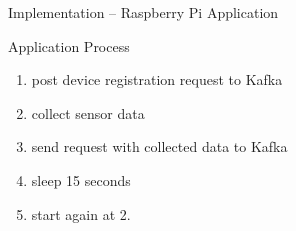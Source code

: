 \begin{frame}{Implementation -- Raspberry Pi Application}
  \begin{block}{Application Process}
    \begin{enumerate}
      \item post device registration request to Kafka
      \item collect sensor data
      \item send request with collected data to Kafka
      \item sleep 15 seconds
      \item start again at 2.
    \end{enumerate}
  \end{block}
\end{frame}
